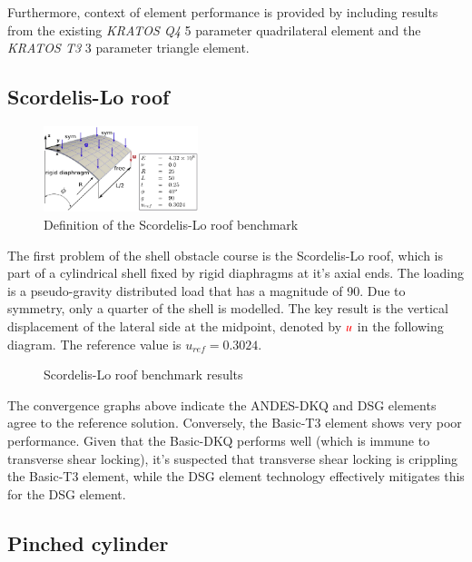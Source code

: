Furthermore, context of element performance is provided by including results from the existing \textit{KRATOS Q4} 5 parameter quadrilateral element and the \textit{KRATOS T3} 3 parameter triangle element.
\newpage
\subsection{Scordelis-Lo roof}

\begin{figure}
	\centering
	\includegraphics[width=0.40\textwidth]{images/scordelisroof.png}
	\caption{Definition of the Scordelis-Lo roof benchmark\cite{Bou13}}
\end{figure}

The first problem of the shell obstacle course is the Scordelis-Lo roof, which is part of a cylindrical shell fixed by rigid diaphragms at it's axial ends. The loading is a pseudo-gravity distributed load that has a magnitude of 90. Due to symmetry, only a quarter of the shell is modelled. The key result is the vertical displacement of the lateral side at the midpoint, denoted by $\textcolor{red}{u}$ in the following diagram. The reference value is $u_{ref} = 0.3024$.
 
\begin{figure}[H]
	\caption{\label{ref_label_overall}Scordelis-Lo roof benchmark results}
\end{figure}

The convergence graphs above indicate the ANDES-DKQ and DSG elements agree to the reference solution. Conversely, the Basic-T3 element shows very poor performance. Given that the Basic-DKQ performs well (which is immune to transverse shear locking), it's suspected that transverse shear locking is crippling the Basic-T3 element, while the DSG element technology effectively mitigates this for the DSG element. 
\newpage
\subsection{Pinched cylinder}

